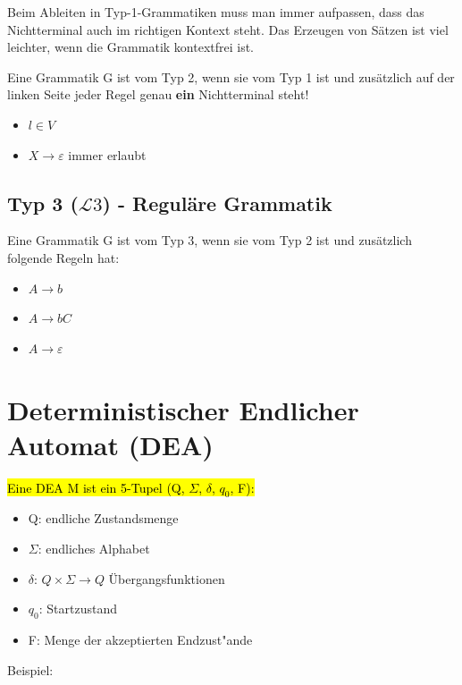 \documentclass[11pt, a4paper]{scrartcl}
\begin{document}
Beim Ableiten in Typ-1-Grammatiken muss man immer aufpassen, dass das Nichtterminal auch im richtigen Kontext steht. 
Das Erzeugen von Sätzen ist viel leichter, wenn die Grammatik kontextfrei ist. 

Eine Grammatik G ist vom Typ 2, wenn sie vom Typ 1 ist und zusätzlich auf der linken Seite jeder Regel genau \textbf{ein} Nichtterminal steht!

\begin{itemize}
    \item $l \in V$
    \item $X \rightarrow \varepsilon$ immer erlaubt
\end{itemize}

\vspace{0.5em}

\subsection{Typ 3 ($\mathcal{L}3$) - Reguläre Grammatik}

Eine Grammatik G ist vom Typ 3, wenn sie vom Typ 2 ist und zusätzlich folgende Regeln hat:

\begin{itemize}
    \item $A \rightarrow b$
    \item $A \rightarrow bC$
    \item $A \rightarrow \varepsilon$
\end{itemize}


\newpage

\section{Deterministischer Endlicher Automat (DEA)}

\hl{Eine DEA M ist ein 5-Tupel (Q, $\Sigma$, $\delta$, $q_0$, F):}

\begin{itemize}
    \item Q: endliche Zustandsmenge
    \item $\Sigma$: endliches Alphabet
    \item $\delta$: $Q \times \Sigma \rightarrow Q$ Übergangsfunktionen
    \item $q_0$: Startzustand
    \item F: Menge der akzeptierten Endzust"ande
\end{itemize}

\vspace{2em}
Beispiel:
\vspace{1em}
\end{document}
